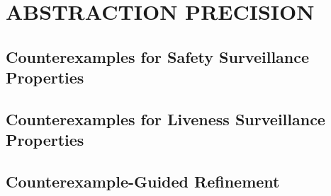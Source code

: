 \documentclass[letterpaper, 10 pt, conference]{ieeeconf}  %
\begin{document}




\section{ ABSTRACTION PRECISION}

\subsection{Counterexamples  for Safety Surveillance Properties}

%
%
%
\subsection{Counterexamples for Liveness Surveillance Properties}

%
%
\subsection{Counterexample-Guided Refinement}

\end{document}
